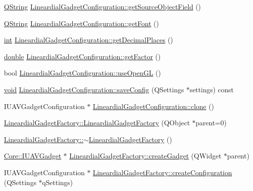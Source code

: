 \begin{DoxyCompactItemize}
\item 
\hyperlink{group___u_a_v_objects_plugin_gab9d252f49c333c94a72f97ce3105a32d}{Q\-String} \hyperlink{group___linear_dial_plugin_ga1de5843a26127b379137ee870ec74b89}{Lineardial\-Gadget\-Configuration\-::get\-Source\-Object\-Field} ()
\item 
\hyperlink{group___u_a_v_objects_plugin_gab9d252f49c333c94a72f97ce3105a32d}{Q\-String} \hyperlink{group___linear_dial_plugin_ga044d31fb1388d1f8b1b11f682c4e2aaa}{Lineardial\-Gadget\-Configuration\-::get\-Font} ()
\item 
\hyperlink{ioapi_8h_a787fa3cf048117ba7123753c1e74fcd6}{int} \hyperlink{group___linear_dial_plugin_gab0a4ac1f433766548d4f87e0d4c1c499}{Lineardial\-Gadget\-Configuration\-::get\-Decimal\-Places} ()
\item 
\hyperlink{_super_l_u_support_8h_a8956b2b9f49bf918deed98379d159ca7}{double} \hyperlink{group___linear_dial_plugin_ga4bb648d826a5f7847ecdaa288a477b14}{Lineardial\-Gadget\-Configuration\-::get\-Factor} ()
\item 
bool \hyperlink{group___linear_dial_plugin_ga74595eab1c81ed96361010ba7f770bd1}{Lineardial\-Gadget\-Configuration\-::use\-Open\-G\-L} ()
\item 
\hyperlink{group___u_a_v_objects_plugin_ga444cf2ff3f0ecbe028adce838d373f5c}{void} \hyperlink{group___linear_dial_plugin_ga09129321da61b2494dca4ceafa18b996}{Lineardial\-Gadget\-Configuration\-::save\-Config} (Q\-Settings $\ast$settings) const 
\item 
I\-U\-A\-V\-Gadget\-Configuration $\ast$ \hyperlink{group___linear_dial_plugin_ga4b5d2c9802ec3b863732d6f707a1befe}{Lineardial\-Gadget\-Configuration\-::clone} ()
\item 
\hyperlink{group___linear_dial_plugin_ga65f46ec9f31c70119c149accc51b304e}{Lineardial\-Gadget\-Factory\-::\-Lineardial\-Gadget\-Factory} (Q\-Object $\ast$parent=0)
\item 
\hyperlink{group___linear_dial_plugin_ga85102065ae14d80cf83202637c76b94c}{Lineardial\-Gadget\-Factory\-::$\sim$\-Lineardial\-Gadget\-Factory} ()
\item 
\hyperlink{class_core_1_1_i_u_a_v_gadget}{Core\-::\-I\-U\-A\-V\-Gadget} $\ast$ \hyperlink{group___linear_dial_plugin_gad0365f5bab013eac15acf924e0bc2821}{Lineardial\-Gadget\-Factory\-::create\-Gadget} (Q\-Widget $\ast$parent)
\item 
I\-U\-A\-V\-Gadget\-Configuration $\ast$ \hyperlink{group___linear_dial_plugin_ga280a4a9d168f6d6b477c30630fdb128b}{Lineardial\-Gadget\-Factory\-::create\-Configuration} (Q\-Settings $\ast$q\-Settings)

\end{DoxyCompactItemize}

